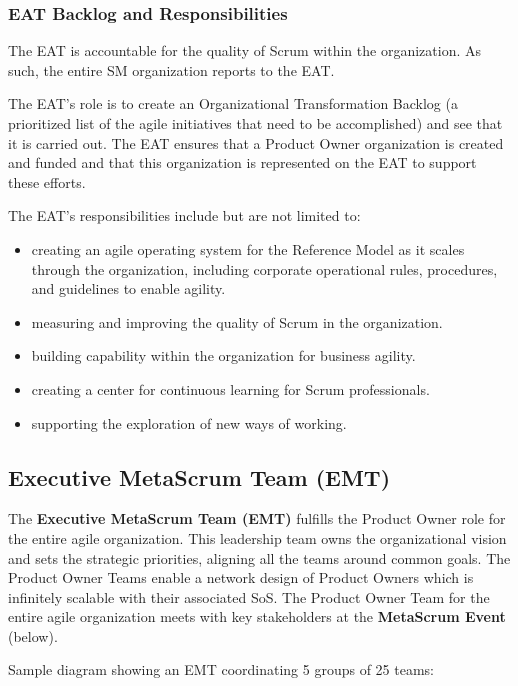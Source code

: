 \documentclass[12pt,a4paper,parskip=full]{scrartcl}
\begin{document}
\subsubsection{EAT Backlog and Responsibilities}

The EAT is accountable for the quality of Scrum within the organization. As such, the entire SM organization reports to the EAT.

The EAT's role is to create an Organizational Transformation Backlog (a prioritized list of the agile initiatives that need to be accomplished) and see that it is carried out. The EAT ensures that a Product Owner organization is created and funded and that this organization is represented on the EAT to support these efforts. 

The EAT's responsibilities include but are not limited to:

\begin{itemize}
	\item creating an agile operating system for the Reference Model as it scales through the organization, including corporate operational rules, procedures, and guidelines to enable agility.
	\item measuring and improving the quality of Scrum in the organization.
	\item building capability within the organization for business agility.
	\item creating a center for continuous learning for Scrum professionals.
	\item supporting the exploration of new ways of working.
\end{itemize}

\subsection{Executive MetaScrum Team (EMT)}

The \textbf{Executive MetaScrum Team (EMT)} fulfills the Product Owner role for the entire agile organization. This leadership team owns the organizational vision and sets the strategic priorities, aligning all the teams around common goals. The Product Owner Teams enable a network design of Product Owners which is infinitely scalable with their associated SoS. The Product Owner Team for the entire agile organization meets with key stakeholders at the \textbf{MetaScrum Event} (below).

Sample diagram showing an EMT coordinating 5 groups of 25 teams:
\end{document}

